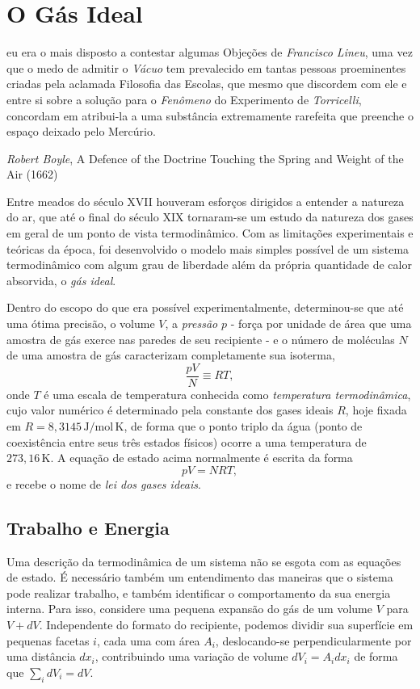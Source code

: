 \section{O Gás Ideal}

\epigraph{\justifying [...] eu era o mais disposto a contestar algumas Objeções
de \emph{Francisco Lineu}, uma vez que o medo de admitir o \emph{Vácuo} tem
prevalecido em tantas pessoas proeminentes criadas pela aclamada Filosofia das
Escolas, que mesmo que discordem com ele e entre si sobre a solução para o
\emph{Fenômeno} do Experimento de \emph{Torricelli}, concordam em atribui-la a
uma substância extremamente rarefeita que preenche o espaço deixado pelo
Mercúrio.}{\emph{Robert Boyle}, A Defence of the Doctrine Touching the Spring
and Weight of the Air (1662)}

\noindent Entre meados do século XVII houveram esforços dirigidos a entender a
natureza do ar, que até o final do século XIX tornaram-se um estudo da natureza
dos gases em geral de um ponto de vista termodinâmico. Com as limitações
experimentais e teóricas da época, foi desenvolvido o modelo mais simples
possível de um sistema termodinâmico com algum grau de liberdade além da própria
quantidade de calor absorvida, o \emph{gás ideal}. 

Dentro do escopo do que era possível experimentalmente, determinou-se que até
uma ótima precisão, o volume $V$, a \emph{pressão} $p$ - força por unidade de
área que uma amostra de gás exerce nas paredes de seu recipiente - e o número de
moléculas $N$ de uma amostra de gás caracterizam completamente sua isoterma, 
$$\frac{pV}{N}\equiv RT,$$
onde $T$ é uma escala de temperatura conhecida como \emph{temperatura
termodinâmica}, cujo valor numérico é determinado pela constante dos gases
ideais $R$, hoje fixada em $R=8{,}3145\,\mathrm{J/mol\,K}$, de forma que o ponto
triplo da água (ponto de coexistência entre seus três estados físicos) ocorre a
uma temperatura de $273{,}16\,\mathrm K$. A equação de estado acima normalmente
é escrita da forma
$$pV=NRT,$$
e recebe o nome de \emph{lei dos gases ideais}.

\subsection{Trabalho e Energia}

Uma descrição da termodinâmica de um sistema não se esgota com as equações de
estado. É necessário também um entendimento das maneiras que o sistema pode
realizar trabalho, e também identificar o comportamento da sua energia interna.
Para isso, considere uma pequena expansão do gás de um volume $V$ para $V+dV$.
Independente do formato do recipiente, podemos dividir sua superfície em
pequenas facetas $i$, cada uma com área $A_i$, deslocando-se perpendicularmente
por uma distância $dx_i$, contribuindo uma variação de volume $dV_i=A_idx_i$ de
forma que $\sum_idV_i=dV$.

